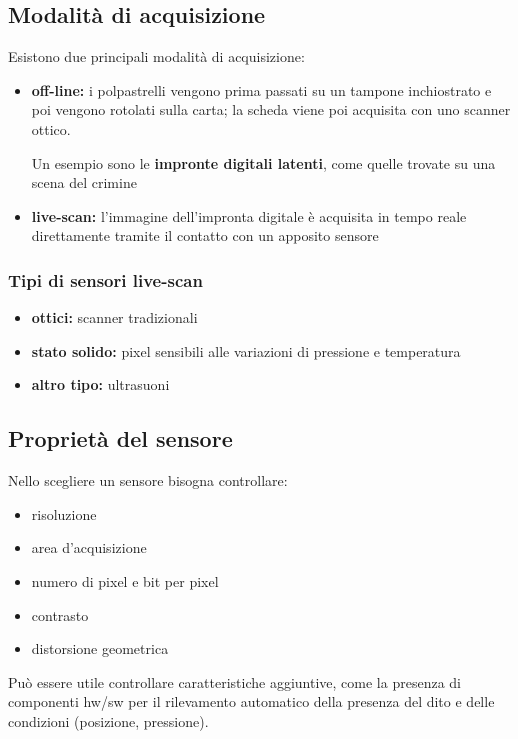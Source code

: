 \subsection{Modalità di acquisizione}
Esistono due principali modalità di acquisizione:
\begin{itemize}
    \item \textbf{off-line:} i polpastrelli vengono prima passati su un tampone inchiostrato e poi 
    vengono rotolati sulla carta; la scheda viene poi acquisita con uno scanner ottico.

    Un esempio sono le \textbf{impronte digitali latenti}, come quelle trovate su una scena del crimine
    \item \textbf{live-scan:} l'immagine dell'impronta digitale è acquisita in tempo reale 
    direttamente tramite il contatto con un apposito sensore
\end{itemize}

\subsubsection{Tipi di sensori live-scan}
\begin{itemize}
    \item \textbf{ottici:} scanner tradizionali
    \item \textbf{stato solido:} pixel sensibili alle variazioni di pressione e temperatura
    \item \textbf{altro tipo:} ultrasuoni
\end{itemize}

\subsection{Proprietà del sensore}

Nello scegliere un sensore bisogna controllare:
\begin{itemize}
    \item risoluzione
    \item area d'acquisizione
    \item numero di pixel e bit per pixel
    \item contrasto
    \item distorsione geometrica
\end{itemize}
Può essere utile controllare caratteristiche aggiuntive, come la presenza di componenti
hw/sw per il rilevamento automatico della presenza del dito e delle condizioni (posizione, pressione).

\newpage
